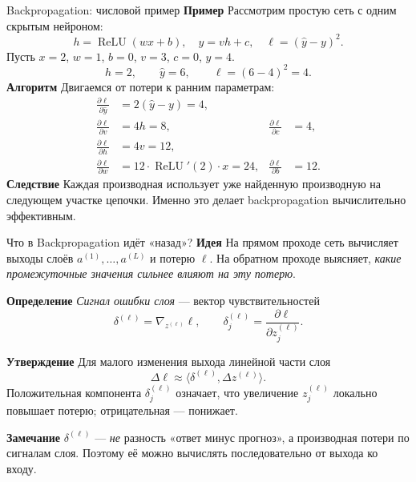 \documentclass[10pt]{beamer}
\newcommand{\mlBody}{\normalsize}
\newcommand{\mlDefinition}{\textcolor{defblue}{\bfseries Определение}}
\newcommand{\mlStatement}{\textcolor{defblue}{\bfseries Утверждение}}
\newcommand{\mlRemark}{\textcolor{defblue}{\bfseries Замечание}}
\newcommand{\mlConsequence}{\textcolor{defblue}{\bfseries Следствие}}
\newcommand{\mlIdea}{\textcolor{defblue}{\bfseries Идея}}
\newcommand{\mlExample}{\textcolor{defblue}{\bfseries Пример}}
\newcommand{\mlAlgorithm}{\textcolor{defblue}{\bfseries Алгоритм}}
\begin{document}
\begin{frame}{Backpropagation: числовой пример}
\mlBody
\mlExample\; Рассмотрим простую сеть с одним скрытым нейроном:
\[
 h=\operatorname{ReLU}(wx+b),\quad
 \hat y=vh+c,\quad \ell=(\hat y-y)^2.
\]
Пусть $x=2$, $w=1$, $b=0$, $v=3$, $c=0$, $y=4$.
\[
 h=2,\qquad\hat y=6,\qquad\ell=(6-4)^2=4.
\]
\mlAlgorithm\; Двигаемся от потери к ранним параметрам:
\[
\begin{aligned}
 \frac{\partial\ell}{\partial\hat y}&=2(\hat y-y)=4,\\
 \frac{\partial\ell}{\partial v}&=4h=8,
 &\frac{\partial\ell}{\partial c}&=4,\\
 \frac{\partial\ell}{\partial h}&=4v=12,\\
 \frac{\partial\ell}{\partial w}&=12\cdot\operatorname{ReLU}'(2)\cdot x=24,
 &\frac{\partial\ell}{\partial b}&=12.
\end{aligned}
\]
\mlConsequence\; Каждая производная использует уже найденную
производную на следующем участке цепочки. Именно это делает
backpropagation вычислительно эффективным.
\end{frame}


\begin{frame}{Что в Backpropagation идёт «назад»?}
\mlBody
\mlIdea\; На прямом проходе сеть вычисляет выходы
слоёв $a^{(1)},\ldots,a^{(L)}$ и потерю $\ell$.
На обратном проходе выясняет, \emph{какие промежуточные значения
сильнее влияют на эту потерю}.

\mlDefinition\; \textit{Сигнал ошибки слоя} --- вектор
чувствительностей
\[
 \boxed{\delta^{(\ell)}=\nabla_{z^{(\ell)}}\ell},\qquad
 \delta_j^{(\ell)}=\frac{\partial\ell}{\partial z_j^{(\ell)}}.
\]

\mlStatement\; Для малого изменения выхода линейной части слоя
\[
 \Delta\ell\approx
 \bigl\langle\delta^{(\ell)},\Delta z^{(\ell)}\bigr\rangle.
\]
Положительная компонента $\delta_j^{(\ell)}$ означает, что
увеличение $z_j^{(\ell)}$ локально повышает потерю;
отрицательная --- понижает.

\mlRemark\; $\delta^{(\ell)}$ --- \emph{не} разность
«ответ минус прогноз», а производная потери по сигналам слоя.
Поэтому её можно вычислять последовательно от выхода ко входу.
\end{frame}
\end{document}
